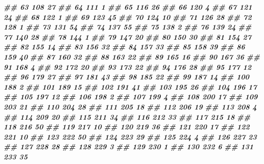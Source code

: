\documentclass[
]{book}
\newenvironment{Shaded}{\begin{snugshade}}{\end{snugshade}}
\newcommand{\DocumentationTok}[1]{\textcolor[rgb]{0.56,0.35,0.01}{\textbf{\textit{#1}}}}
\theoremstyle{definition}
\theoremstyle{definition}
\theoremstyle{definition}
\theoremstyle{definition}
\theoremstyle{remark}
\begin{document}
\begin{Shaded}
\begin{Highlighting}[]
\DocumentationTok{\#\# 63     108 27}
\DocumentationTok{\#\# 64     111  1}
\DocumentationTok{\#\# 65     116 26}
\DocumentationTok{\#\# 66     120  4}
\DocumentationTok{\#\# 67     121 24}
\DocumentationTok{\#\# 68     122  1}
\DocumentationTok{\#\# 69     123 45}
\DocumentationTok{\#\# 70     124 10}
\DocumentationTok{\#\# 71     126 28}
\DocumentationTok{\#\# 72     128  1}
\DocumentationTok{\#\# 73     131 54}
\DocumentationTok{\#\# 74     137 55}
\DocumentationTok{\#\# 75     138  2}
\DocumentationTok{\#\# 76     139 24}
\DocumentationTok{\#\# 77     140 28}
\DocumentationTok{\#\# 78     144  1}
\DocumentationTok{\#\# 79     147 20}
\DocumentationTok{\#\# 80     150 30}
\DocumentationTok{\#\# 81     154 27}
\DocumentationTok{\#\# 82     155 14}
\DocumentationTok{\#\# 83     156 32}
\DocumentationTok{\#\# 84     157 33}
\DocumentationTok{\#\# 85     158 39}
\DocumentationTok{\#\# 86     159 40}
\DocumentationTok{\#\# 87     160 32}
\DocumentationTok{\#\# 88     163 22}
\DocumentationTok{\#\# 89     165 16}
\DocumentationTok{\#\# 90     167 36}
\DocumentationTok{\#\# 91     168  4}
\DocumentationTok{\#\# 92     172 20}
\DocumentationTok{\#\# 93     173 22}
\DocumentationTok{\#\# 94     176 28}
\DocumentationTok{\#\# 95     177 12}
\DocumentationTok{\#\# 96     179 27}
\DocumentationTok{\#\# 97     181 43}
\DocumentationTok{\#\# 98     185 22}
\DocumentationTok{\#\# 99     187 14}
\DocumentationTok{\#\# 100    188  2}
\DocumentationTok{\#\# 101    189 15}
\DocumentationTok{\#\# 102    191 41}
\DocumentationTok{\#\# 103    195 26}
\DocumentationTok{\#\# 104    196 17}
\DocumentationTok{\#\# 105    197 12}
\DocumentationTok{\#\# 106    198  2}
\DocumentationTok{\#\# 107    199  4}
\DocumentationTok{\#\# 108    200 17}
\DocumentationTok{\#\# 109    203 21}
\DocumentationTok{\#\# 110    204 28}
\DocumentationTok{\#\# 111    205 18}
\DocumentationTok{\#\# 112    206 19}
\DocumentationTok{\#\# 113    208  4}
\DocumentationTok{\#\# 114    209 20}
\DocumentationTok{\#\# 115    211 34}
\DocumentationTok{\#\# 116    212 33}
\DocumentationTok{\#\# 117    215 18}
\DocumentationTok{\#\# 118    216 50}
\DocumentationTok{\#\# 119    217 10}
\DocumentationTok{\#\# 120    219 36}
\DocumentationTok{\#\# 121    220 17}
\DocumentationTok{\#\# 122    221 10}
\DocumentationTok{\#\# 123    222 50}
\DocumentationTok{\#\# 124    223 29}
\DocumentationTok{\#\# 125    224  4}
\DocumentationTok{\#\# 126    227 23}
\DocumentationTok{\#\# 127    228 28}
\DocumentationTok{\#\# 128    229  3}
\DocumentationTok{\#\# 129    230  1}
\DocumentationTok{\#\# 130    232  6}
\DocumentationTok{\#\# 131    233 35}

\end{Highlighting}
\end{Shaded}
\end{document}
